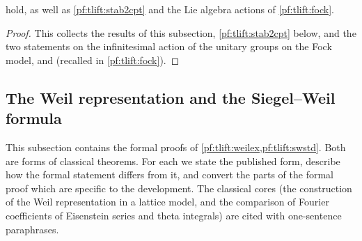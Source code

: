 \begin{theorem}\label{pf:tlift:toolsthm}
 hold, as well as \cref{pf:tlift:stab2cpt} and the Lie algebra actions of
\cref{pf:tlift:fock}.
\end{theorem}

\begin{proof}
This collects the results of this subsection, \cref{pf:tlift:stab2cpt} below, and the two statements on
the infinitesimal action of the unitary groups on the Fock model,  and
 (recalled in \cref{pf:tlift:fock}).
\end{proof}


\subsection{The Weil representation and the Siegel--Weil formula}\label{pf:tlift:classical}

This subsection contains the formal proofs of \cref{pf:tlift:weilex,pf:tlift:swstd}. Both are forms of classical
theorems. For each we state the published form, describe how the formal statement differs from it, and convert
the parts of the formal proof which are specific to the development. The classical cores (the construction of the
Weil representation in a lattice model, and the comparison of Fourier coefficients of Eisenstein series and theta
integrals) are cited with one-sentence paraphrases.

